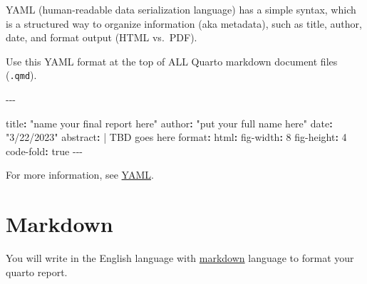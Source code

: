 \documentclass[
  english,
  letterpaper,
  DIV=11,
  numbers=noendperiod]{scrreprt}
\newenvironment{Shaded}{\begin{snugshade}}{\end{snugshade}}
\newcommand{\AttributeTok}[1]{\textcolor[rgb]{0.40,0.45,0.13}{#1}}
\newcommand{\CharTok}[1]{\textcolor[rgb]{0.13,0.47,0.30}{#1}}
\newcommand{\DecValTok}[1]{\textcolor[rgb]{0.68,0.00,0.00}{#1}}
\newcommand{\FunctionTok}[1]{\textcolor[rgb]{0.28,0.35,0.67}{#1}}
\newcommand{\KeywordTok}[1]{\textcolor[rgb]{0.00,0.23,0.31}{\textbf{#1}}}
\newcommand{\NormalTok}[1]{\textcolor[rgb]{0.00,0.23,0.31}{#1}}
\newcommand{\PreprocessorTok}[1]{\textcolor[rgb]{0.68,0.00,0.00}{#1}}
\newcommand{\StringTok}[1]{\textcolor[rgb]{0.13,0.47,0.30}{#1}}
\begin{document}
YAML (human-readable data serialization language) has a simple syntax,
which is a structured way to organize information (aka metadata), such
as title, author, date, and format output (HTML vs.~PDF).

\begin{tcolorbox}[enhanced jigsaw, title=\textcolor{quarto-callout-important-color}{\faExclamation}\hspace{0.5em}{Requirement}, opacityback=0, colframe=quarto-callout-important-color-frame, rightrule=.15mm, left=2mm, toprule=.15mm, leftrule=.75mm, titlerule=0mm, bottomtitle=1mm, breakable, arc=.35mm, toptitle=1mm, bottomrule=.15mm, coltitle=black, opacitybacktitle=0.6, colback=white, colbacktitle=quarto-callout-important-color!10!white]

Use this YAML format at the top of ALL Quarto markdown document files
(\texttt{.qmd}).

\end{tcolorbox}

\begin{Shaded}
\begin{Highlighting}[]
\PreprocessorTok{{-}{-}{-}}

\FunctionTok{title}\KeywordTok{:}\AttributeTok{ }\StringTok{"name your final report here"}
\FunctionTok{author}\KeywordTok{:}\AttributeTok{ }\StringTok{"put your full name here"}
\FunctionTok{date}\KeywordTok{:}\AttributeTok{ }\StringTok{"3/22/2023"}
\FunctionTok{abstract}\KeywordTok{: }\CharTok{|}
\NormalTok{    TBD goes here}
\FunctionTok{format}\KeywordTok{:}\AttributeTok{ }
\AttributeTok{  }\FunctionTok{html}\KeywordTok{:}
\AttributeTok{    }\FunctionTok{fig{-}width}\KeywordTok{:}\AttributeTok{ }\DecValTok{8}
\AttributeTok{    }\FunctionTok{fig{-}height}\KeywordTok{:}\AttributeTok{ }\DecValTok{4}
\AttributeTok{    }\FunctionTok{code{-}fold}\KeywordTok{:}\AttributeTok{ }\CharTok{true}
\AttributeTok{    }
\PreprocessorTok{{-}{-}{-}}
\end{Highlighting}
\end{Shaded}

For more information, see
\href{https://quarto.org/docs/reference/formats/html.html}{YAML}.

\chapter{Markdown}\label{markdown}

You will write in the English language with
\href{https://quarto.org/docs/authoring/markdown-basics.html}{markdown}
language to format your quarto report.
\end{document}

